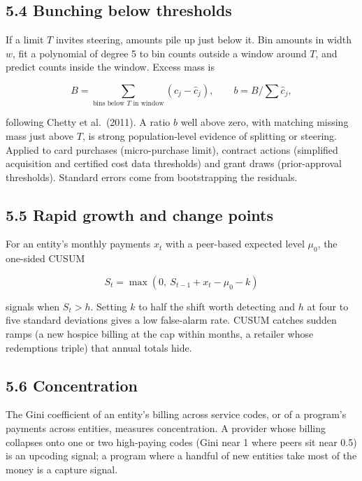 \documentclass[letterpaper,11pt]{article}
\begin{document}
\hypertarget{bunching-below-thresholds}{%
\subsection*{5.4 Bunching below
thresholds}\label{bunching-below-thresholds}}

If a limit \(T\) invites steering, amounts pile up just below it. Bin
amounts in width \(w\), fit a polynomial of degree 5 to bin counts
outside a window around \(T\), and predict counts inside the window.
Excess mass is

\[B = \sum_{\text{bins below } T \text{ in window}} (c_j - \hat c_j), \qquad
b = B \Big/ \sum \hat c_j,\]

following Chetty et al.~(2011). A ratio \(b\) well above zero, with
matching missing mass just above \(T\), is strong population-level
evidence of splitting or steering. Applied to card purchases
(micro-purchase limit), contract actions (simplified acquisition and
certified cost data thresholds) and grant draws (prior-approval
thresholds). Standard errors come from bootstrapping the residuals.

\hypertarget{rapid-growth-and-change-points}{%
\subsection*{5.5 Rapid growth and change
points}\label{rapid-growth-and-change-points}}

For an entity's monthly payments \(x_t\) with a peer-based expected
level \(\mu_0\), the one-sided CUSUM

\[S_t = \max(0,\ S_{t-1} + x_t - \mu_0 - k)\]

signals when \(S_t > h\). Setting \(k\) to half the shift worth
detecting and \(h\) at four to five standard deviations gives a low
false-alarm rate. CUSUM catches sudden ramps (a new hospice billing at
the cap within months, a retailer whose redemptions triple) that annual
totals hide.

\hypertarget{concentration}{%
\subsection*{5.6 Concentration}\label{concentration}}

The Gini coefficient of an entity's billing across service codes, or of
a program's payments across entities, measures concentration. A provider
whose billing collapses onto one or two high-paying codes (Gini near 1
where peers sit near 0.5) is an upcoding signal; a program where a
handful of new entities take most of the money is a capture signal.
\end{document}
